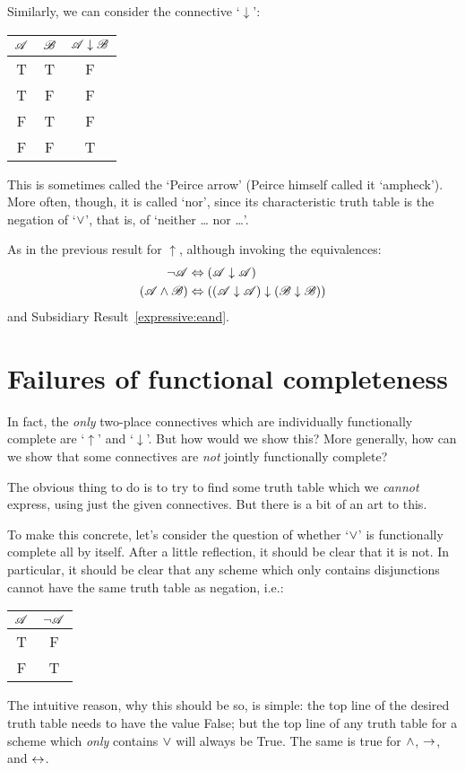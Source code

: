 Similarly, we can consider the connective `$\downarrow$':
\begin{center}
\begin{tabular}{c c | c}
$\mathscr{A}$ & $\mathscr{B}$ & $\mathscr{A} \mathrel{\downarrow} \mathscr{B}$\\
\hline
 T & T & F \\
 T & F & F  \\
 F & T & F  \\
 F & F & T
\end{tabular}
\end{center}
This is sometimes called the `Peirce arrow' (Peirce himself called it `ampheck'). More often, though, it is called `nor', since its characteristic truth table is the negation of `$\vee$', that is, of `neither \dots{} nor \dots'.

As in the previous result for $\uparrow$, although invoking the equivalences:
		\begin{align*}
			\neg \mathscr{A} &\Leftrightarrow (\mathscr{A} \downarrow \mathscr{A})\\
			(\mathscr{A} \wedge \mathscr{B}) & \Leftrightarrow ((\mathscr{A} \downarrow \mathscr{A}) \downarrow (\mathscr{B} \downarrow \mathscr{B}))
		\end{align*}
and Subsidiary Result~\ref*{expressive:eand}.


\section{Failures of functional completeness}

In fact, the \emph{only} two-place connectives which are individually functionally complete are `$\uparrow$' and `$\downarrow$'. But how would we show this? More generally, how can we show that some connectives are \emph{not} jointly functionally complete? 
 
The obvious thing to do is to try to find some truth table which we \emph{cannot} express, using just the given connectives. But there is a bit of an art to this.

To make this concrete, let's consider the question of whether `$\vee$' is functionally complete all by itself. After a little reflection, it should be clear that it is not. In particular, it should be clear that any scheme which only contains disjunctions cannot have the same truth table as negation, i.e.:
				\begin{center}
				\begin{tabular}{c | c}
				$\mathscr{A}$ & $\neg \mathscr{A}$\\
				\hline
				 T & F \\
				 F & T
				\end{tabular}
				\end{center}
The intuitive reason, why this should be so, is simple: the top line of the desired truth table needs to have the value False; but the top line of any truth table for a scheme which \emph{only} contains $\vee$ will always be True. The same is true for $\wedge$, $\rightarrow$, and $\leftrightarrow$.

